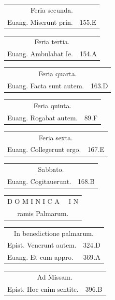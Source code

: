 \documentclass[a5paper,10pt]{book}
\begin{document}
\begin{multicols}{2}
\begin{tabular}{l r}
\multicolumn{2}{c}{\color{red} Feria secunda.}\\
Euang. Miserunt prin. & 155.E\\
\end{tabular}
\begin{tabular}{l r}
\multicolumn{2}{c}{\color{red} Feria tertia.}\\
Euang. Ambulabat Ie. & 154.A\\
\end{tabular}
\begin{tabular}{l r}
\multicolumn{2}{c}{\color{red} Feria quarta.}\\
Euang. Facta sunt autem. & 163.D\\
\end{tabular}
\begin{tabular}{l r}
\multicolumn{2}{c}{\color{red} Feria quinta.}\\
Euang. Rogabat autem. & 89.F\\
\end{tabular}
\begin{tabular}{l r}
\multicolumn{2}{c}{\color{red} Feria sexta.}\\
Euang. Collegerunt ergo. & 167.E\\
\end{tabular}
\begin{tabular}{l r}
\multicolumn{2}{c}{\color{red} Sabbato.}\\
Euang. Cogitauerunt. & 168.B\\
\end{tabular}
\par
\vspace{-.5em}
\begin{tabular}{c}
\color{red} \large D O M I N I C A \ \ I N\\
\color{red} ramis Palmarum.\\
\end{tabular}
\par
\vspace{-.5em}
\begin{tabular}{l r}
\multicolumn{2}{c}{\color{red} In benedictione palmarum.}\\
Epist. Venerunt autem. & 324.D\\
Euang. Et cum appro. & 369.A\\
\end{tabular}
\begin{tabular}{l r}
\multicolumn{2}{c}{\color{red} Ad Missam.}\\
Epist. Hoc enim sentite. & 396.B\\

\end{tabular}
\end{multicols}
\end{document}
